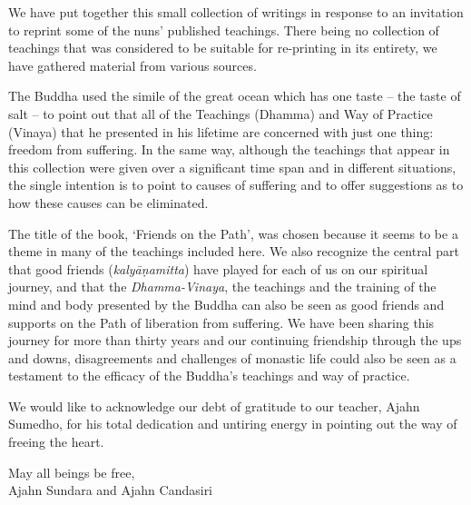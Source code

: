 
We have put together this small collection of writings in response to an invitation to reprint some of the nuns' published teachings. There being no collection of teachings that was considered to be suitable for re-printing in its entirety, we have gathered material from various sources.

The Buddha used the simile of the great ocean which has one taste -- the taste of salt -- to point out that all of the Teachings (Dhamma) and Way of Practice (Vinaya) that he presented in his lifetime are concerned with just one thing: freedom from suffering. In the same way, although the teachings that appear in this collection were given over a significant time span and in different situations, the single intention is to point to causes of suffering and to offer suggestions as to how these causes can be eliminated.

The title of the book, `Friends on the Path', was chosen because it seems to be a theme in many of the teachings included here. We also recognize the central part that good friends (\textit{kaly\=a\d{n}amitta}) have played for each of us on our spiritual journey, and that the \textit{Dhamma-Vinaya}, the teachings and the training of the mind and body presented by the Buddha can also be seen as good friends and supports on the Path of liberation from suffering. We have been sharing this journey for more than thirty years and our continuing friendship through the ups and downs, disagreements and challenges of monastic life could also be seen as a testament to the efficacy of the Buddha's teachings and way of practice.

We would like to acknowledge our debt of gratitude to our teacher, Ajahn Sumedho, for his total dedication and untiring energy in pointing out the way of freeing the heart.
\bigskip

{\raggedleft\par
May all beings be free,\\
Ajahn Sundara and Ajahn Candasiri \par}
